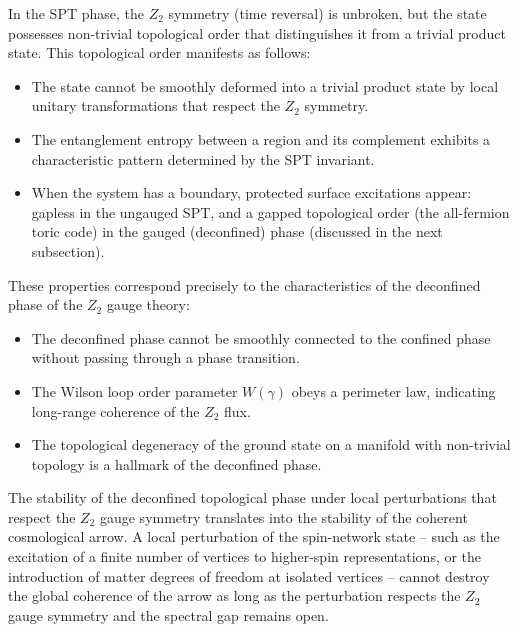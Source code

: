 \documentclass[preprint]{SciPost}
\theoremstyle{plain} %
\begin{document}
In the SPT phase, the $ Z_2 $ symmetry (time reversal) is unbroken, but the state possesses non-trivial topological order that distinguishes it from a trivial product state. This topological order manifests as follows:
\begin{itemize}
	\item The state cannot be smoothly deformed into a trivial product state by local unitary transformations that respect the $ Z_2 $ symmetry.
	\item The entanglement entropy between a region and its complement exhibits a characteristic pattern determined by the SPT invariant.
	\item When the system has a boundary, protected surface excitations appear: gapless in the ungauged SPT, and a gapped topological order (the all-fermion toric code) in the gauged (deconfined) phase (discussed in the next subsection).
\end{itemize}

These properties correspond precisely to the characteristics of the deconfined phase of the $ Z_2 $ gauge theory:
\begin{itemize}
	\item The deconfined phase cannot be smoothly connected to the confined phase without passing through a phase transition.
	\item The Wilson loop order parameter $ W(\gamma) $ obeys a perimeter law, indicating long-range coherence of the $ Z_2 $ flux.
	\item The topological degeneracy of the ground state on a manifold with non-trivial topology is a hallmark of the deconfined phase.
\end{itemize}

The stability of the deconfined topological phase under local perturbations that respect the $ Z_2 $ gauge symmetry translates into the stability of the coherent cosmological arrow. A local perturbation of the spin-network state -- such as the excitation of a finite number of vertices to higher-spin representations, or the introduction of matter degrees of freedom at isolated vertices -- cannot destroy the global coherence of the arrow as long as the perturbation respects the $ Z_2 $ gauge symmetry and the spectral gap remains open.
\end{document}
